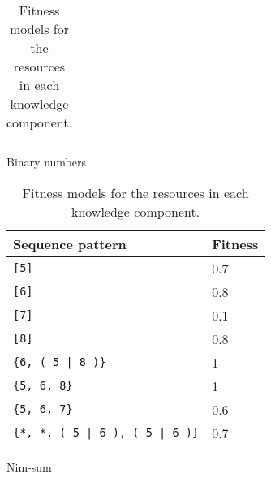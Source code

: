 \begin{table}
\begin{subtable}{0.5\linewidth}
\begin{tabular}[ht]{ll}
\end{tabular}
\caption{Binary numbers}
\label{tab:apx_fitness_handcrafted_binary}
\end{subtable}
\begin{subtable}{0.45\linewidth}
\begin{tabular}[ht]{ll}\hline
	Sequence pattern & Fitness \\\hline
	\verb![5]! & 0.7 \\
	\verb![6]! & 0.8 \\
	\verb![7]! & 0.1 \\
	\verb![8]! & 0.8 \\
	\verb!{6, ( 5 | 8 )}! & 1 \\
	\verb!{5, 6, 8}! & 1 \\
	\verb!{5, 6, 7}! & 0.6 \\
	\verb!{*, *, ( 5 | 6 ), ( 5 | 6 )}! & 0.7\\
\end{tabular}
\caption{Nim-sum}
\label{tab:apx_fitness_handcrafted_nimsum}
\end{subtable}
\caption{Fitness models for the resources in each knowledge component.}
\label{tab:apx_fitness_handcrafted}
\end{table}
